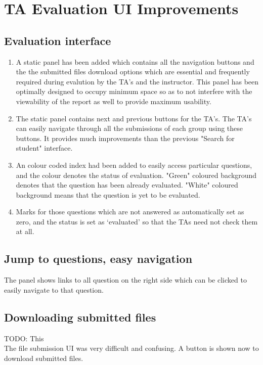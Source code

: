\section{TA Evaluation UI Improvements}

\subsection{Evaluation interface}

\begin{enumerate}
\item A static panel has been added which contains all the navigation buttons and the the submitted files download options which are essential and frequently required during evalution by the TA's and the instructor. This panel has been optimally designed to occupy minimum space so as to not interfere with the viewability of the report as well to provide maximum usability.
\item The static panel contains next and previous buttons for the TA's. The TA's can easily navigate through all the submissions of each group using these buttons. It provides much improvements than the previous "Search for student" interface.
\item An colour coded index had been added to easily access particular questions, and the colour denotes the status of evaluation. "Green" coloured background denotes that the question has been already evaluated. "White" coloured background means that the question is yet to be evaluated.
\item Marks for those questions which are not answered as automatically set as zero, and the status is set as `evaluated' so that the TAs need not check them at all.
\end{enumerate}

\subsection{Jump to questions, easy navigation}
The panel shows links to all question on the right side which can be clicked to easily navigate to that question.

\subsection{Downloading submitted files}
TODO: This\\
The file submission UI was very difficult and confusing. A button is shown now to download submitted files.
